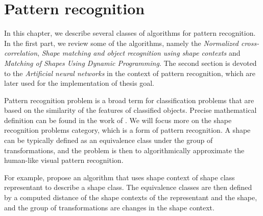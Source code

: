 \chapter{Pattern recognition}
In this chapter, we describe several classes of algorithms for pattern recognition. In the first part, we review some of the algorithms, namely the \emph{Normalized cross-correlation}, \emph{Shape matching and object recognition using shape contexts} and \emph{Matching of Shapes Using Dynamic Programming}. The second section is devoted to the \emph{Artificial neural networks} in the context of pattern recognition, which are later used for the implementation of thesis goal.

Pattern recognition problem is a broad term for classification problems that are based on the similarity of the features of classified objects. Precise mathematical definition can be found in the work of \citet{formalMethods}. We will focus more on the shape recognition problems category, which is a form of pattern recognition. A shape can be typically defined as an equivalence class under the group of transformations, and the problem is then to algorithmically approximate the human-like visual pattern recognition. 

For example, \citet{simple} propose an algorithm that uses shape context of shape class representant to describe a shape class. The equivalence classes are then defined by a computed distance of the shape contexts of the representant and the shape, and the group of transformations are changes in the shape context.

